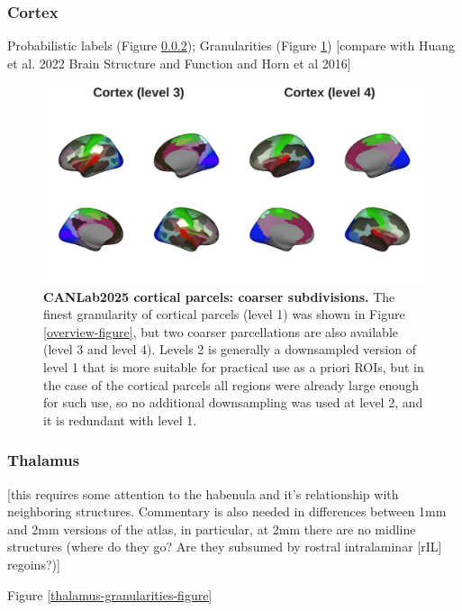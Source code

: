 \documentclass[10pt,letterpaper]{article}
\begin{document}
\subsubsection{Cortex} 
Probabilistic labels (Figure \ref{}); Granularities (Figure \ref{cortex-granularities-figure})
[compare with Huang et al. 2022 Brain Structure and Function and Horn et al 2016]


\begin{figure}[t]
\centering
\includegraphics[width=\linewidth]{images/cortex_label_granularities.png}
\caption{
{\bf
CANLab2025 cortical parcels: coarser subdivisions.} 
The finest granularity of cortical parcels (level 1) was shown in Figure \ref{overview-figure}, but two coarser parcellations are also available (level 3 and level 4). Levels 2 is generally a downsampled version of level 1 that is more suitable for practical use as a priori ROIs, but in the case of the cortical parcels all regions were already large enough for such use, so no additional downsampling was used at level 2, and it is redundant with level 1.}
\label{cortex-granularities-figure}
\end{figure}

\subsubsection{Thalamus}
[this requires some attention to the habenula and it's relationship with neighboring structures. Commentary is also needed in differences between 1mm and 2mm versions of the atlas, in particular, at 2mm there are no midline structures (where do they go? Are they subsumed by rostral intralaminar [rIL] regoins?)]

Figure \ref{thalamus-granularities-figure}
\end{document}
